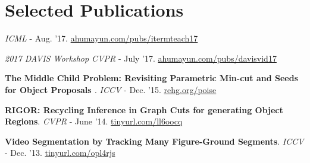\documentclass[10pt,twoside,a4paper]{article}
\newif\ifdetail
\begin{document}
\section{\ifdetail \else Selected \fi Publications}
{
\small
\ifdetail
\textbf{Iterative Machine Teaching}. \ifdetail ($3^{\text{rd}}$ author) \newline \fi
\textit{\ifdetail International Conference on Machine Learning (ICML) \else ICML \fi} - Aug. '17.
\href{http://ahumayun.com/pubs/liu_ICML_2017_itermteach.pdf}{ahumayun.com/pubs/itermteach17} %
\fi

\ifdetail
\textbf{Multiple-Instance Video Segmentation with Sequence-Specific Object Proposals}. \ifdetail ($3^{\text{rd}}$ author) \newline \fi
\textit{\ifdetail The 2017 DAVIS Challenge on Video Object Segmentation - CVPR Workshops \else 2017 DAVIS Workshop CVPR \fi} - July '17.
\href{http://ahumayun.com/pubs/shaban_CVPRDavis_2017_vidsegobjprop.pdf}{ahumayun.com/pubs/davisvid17} %
\fi

\textbf{The Middle Child Problem: \ifdetail\else{\scriptsize\fi Revisiting Parametric Min-cut and Seeds for Object Proposals \ifdetail\else}\fi}. \ifdetail ($1^{\text{st}}$ author) \newline \fi
\textit{\ifdetail International Conference on Computer Vision (ICCV) \else ICCV \fi} - Dec. '15. 
\href{http://rehg.org/poise}{rehg.org/poise} %

\ifdetail
\textbf{Finding Temporally Consistent Occlusion Boundaries in Videos using Geometric Context}. ($2^{\text{nd}}$ author) \newline \textit{IEEE Winter Conference on Applications of Computer Vision (WACV)} - Jan. '15. \href{http://cpl.cc.gatech.edu/projects/temporaloccl/}{cpl.cc.gatech.edu/projects/temporaloccl/} %
\fi

\textbf{RIGOR: Recycling Inference in Graph Cuts for generating Object Regions}. \ifdetail ($1^{\text{st}}$ author) \newline \fi \textit{\ifdetail IEEE Conference on Computer Vision and Pattern Recognition (CVPR) \else CVPR \fi} - June '14. \href{http://cpl.cc.gatech.edu/projects/RIGOR/}{\ifdetail cpl.cc.gatech.edu/projects/RIGOR/ \else tinyurl.com/ll6oocq \fi}

\textbf{Video Segmentation by Tracking Many Figure-Ground Segments}. \ifdetail ($3^{\text{rd}}$ author) \newline \fi \textit{\ifdetail International Conference on Computer Vision (ICCV) \else ICCV \fi} - Dec. '13. \href{http://www.cc.gatech.edu/~fli/SegTrack2/}{\ifdetail cc.gatech.edu/$\sim$fli/SegTrack2/ \else tinyurl.com/opl4rjs \fi}

}
\end{document}
